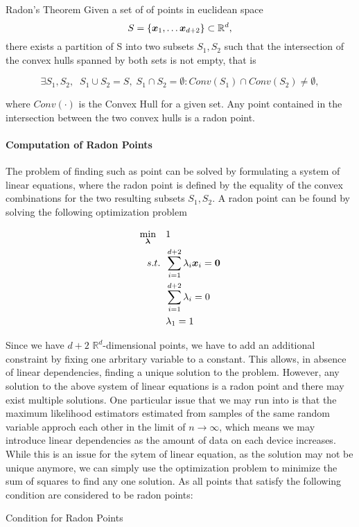 \begin{threm}{Radon's Theorem}
    Given a set of of points in euclidean space
    \begin{equation}
        S = \{\boldsymbol{x}_1, \ldots \boldsymbol{x}_{d+2}\} \subset \mathbb{R}^d,
    \end{equation}
   there exists a partition of S into two subsets $S_1, S_2$ such that the intersection of the convex hulls spanned by both sets is not empty, that is
    
    \begin{equation}
        \exists S_1, S_2, \;\; S_1 \cup S_2 = S, \; S_1 \cap S_2 = \emptyset: Conv(S_1) \cap Conv(S_2) \neq \emptyset,
    \end{equation}

    where $Conv(\cdot)$ is the Convex Hull for a given set.
    Any point contained  in the intersection between the two convex hulls is a radon point.
\end{threm}

\paragraph*{Computation of Radon Points}

The problem of finding such as point can be solved by formulating a system of linear equations, where the radon point is defined by the equality of the convex combinations for the two resulting subsets $S_1, S_2$.
A radon point can be found by solving the following optimization problem

\begin{equation}
    \begin{split}
        \min_{\boldsymbol{\lambda}} \quad &1 \\
        s.t. \;\; &\sum_{i=1}^{d+2} \lambda_i \boldsymbol{x}_i = \boldsymbol{0}\\
             \;\; &\sum_{i=1}^{d+2} \lambda_i = 0 \\
             \; \; & \lambda_1 = 1
    \end{split}
\end{equation}

Since we have $d+2$ $\mathbb{R}^d$-dimensional points, we have to add an additional constraint by fixing one arbritary variable to a constant. 
This allows, in absence of linear dependencies, finding a unique solution to the problem.
However, any solution to the above system of linear equations is a radon point and there may exist multiple solutions.
One particular issue that we may run into is that the maximum likelihood estimators estimated from samples of the same random variable approch each other in the limit of $n \rightarrow \infty$, which means we may introduce linear dependencies as the amount of data on each device increases.
While this is an issue for the sytem of linear equation, as the solution may not be unique anymore, we can simply use the optimization problem to minimize the sum of squares to find any one solution.
As all points that satisfy the following condition are considered to be radon points:
\begin{tcolorbox}
    Condition for Radon Points    
\end{tcolorbox}

